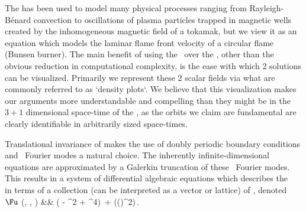 The {\KSe} has been used to model many physical processes ranging from Rayleigh-B\'enard convection
to oscillations of plasma particles trapped in magnetic wells created by
the inhomogeneous magnetic field of a tokamak, but we view it as an equation
which models the laminar flame front velocity of a circular flame (Bunsen burner).
The main benefit of using the \KSe\ over the \NSe, other than the obvious reduction 
in computational complexity, is the ease with which 2{\dmn} {\spt}
solutions can be visualized. Primarily we represent these 2{\dmn} scalar fields via what
are commonly referred to as `density plots`. We believe that this visualization makes our arguments 
more understandable and compelling than they might be
in the $3+1$ dimensional space-time of the \NSe, as the orbits we claim are fundamental are
clearly identifiable in arbitrarily sized space-times. 

Translational invariance of  makes the use of doubly periodic boundary conditions
and \spt\ Fourier modes a natural choice.
The inherently infinite-dimensional equations are approximated
by a Galerkin truncation of these \spt\ Fourier modes.
This results in a system of differential algebraic equations
which describes the \KSe\  in terms of a
collection (can be interpreted as a vector or lattice) of {\spt} {\Fcs}, denoted $\Fu$
\bea \label{e-Fks}
(\Fu, \speriod{}, \period{}) &\equiv& (\mathbf{\omega} - ^2 + ^4)
\,\Fu +  \FFT(\IFFT(\Fu)^2)\,.
\eea

